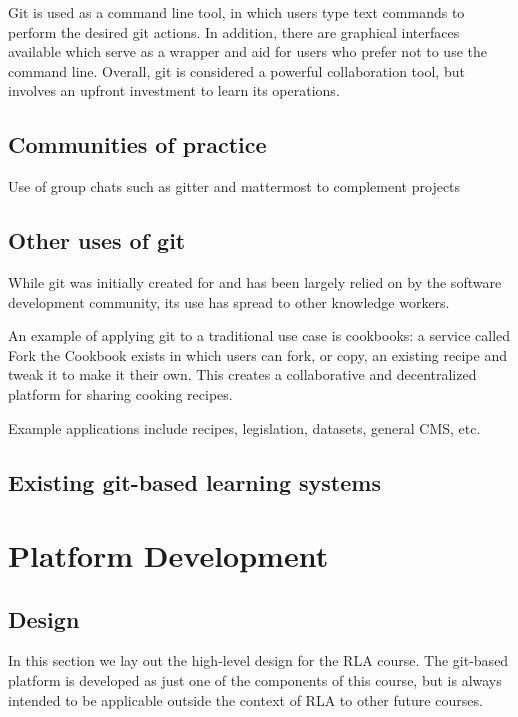 \documentclass[12pt,twoside,vi]{mitthesis}
\begin{document}
Git is used as a command line tool, in which users type text commands to perform the desired git actions. In addition, there are graphical interfaces available which serve as a wrapper and aid for users who prefer not to use the command line. Overall, git is considered a powerful collaboration tool, but involves an upfront investment to learn its operations.

\section{Communities of practice}

Use of group chats such as gitter and mattermost to complement projects

\section{Other uses of git}

While git was initially created for and has been largely relied on by the software development community, its use has spread to other knowledge workers.

An example of applying git to a traditional use case is cookbooks: a service called Fork the Cookbook exists in which users can fork, or copy, an existing recipe and tweak it to make it their own. This creates a collaborative and decentralized platform for sharing cooking recipes.~\cite{forkthecookbook}

Example applications include recipes, legislation, datasets, general CMS, etc.

\section{Existing git-based learning systems}

\chapter{Platform Development}

\section{Design}

In this section we lay out the high-level design for the RLA course. The git-based platform is developed as just one of the components of this course, but is always intended to be applicable outside the context of RLA to other future courses.
\end{document}
